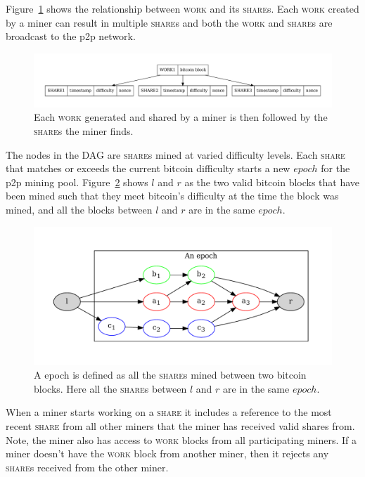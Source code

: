 \documentclass{article}
\begin{document}
Figure~\ref{fig:work-share} shows the relationship between
\textsc{work} and its \textsc{share}s. Each \textsc{work} created by a
miner can result in multiple \textsc{share}s and both the
\textsc{work} and \textsc{share}s are broadcast to the p2p network.

\begin{figure}
  \begin{center}
    \includegraphics[width=1.0\textwidth]{work-share}
    \caption{Each \textsc{work} generated and shared by a miner is then
      followed by the \textsc{share}s the miner finds.}\label{fig:work-share}
    \end{center}
\end{figure}

The nodes in the DAG are \textsc{share}s mined at varied difficulty
levels. Each \textsc{share} that matches or exceeds the current
bitcoin difficulty starts a new $epoch$ for the p2p mining
pool. Figure~\ref{fig:epoch} shows $l$ and $r$ as the two valid
bitcoin blocks that have been mined such that they meet bitcoin's
difficulty at the time the block was mined, and all the blocks between
$l$ and $r$ are in the same $epoch$.

\begin{figure}
  \includegraphics[width=1.0\textwidth]{epoch}
  \caption{A epoch is defined as all the \textsc{share}s mined between two
    bitcoin blocks. Here all the \textsc{share}s between $l$ and $r$ are in
    the same $epoch$.}\label{fig:epoch}
\end{figure}

When a miner starts working on a \textsc{share} it includes a
reference to the most recent \textsc{share} from all other miners that
the miner has received valid shares from. Note, the miner also has
access to \textsc{work} blocks from all participating miners. If a
miner doesn't have the \textsc{work} block from another miner, then it
rejects any \textsc{share}s received from the other miner.
\end{document}
